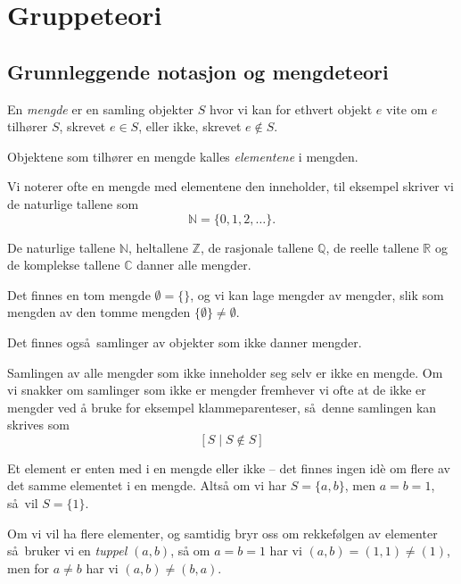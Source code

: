 \section{Gruppeteori}

\subsection{Grunnleggende notasjon og mengdeteori}


\begin{definition}
    En \textit{mengde} er en samling objekter $S$ hvor vi kan for
    ethvert objekt $e$ vite om $e$ tilhører $S$, skrevet $e\in S$,
    eller ikke, skrevet $e\notin S$.

    Objektene som tilhører en mengde kalles \textit{elementene}
    i mengden.
\end{definition}

Vi noterer ofte en mengde med elementene den inneholder,
til eksempel skriver vi de naturlige tallene som
\[
    \mathbb N = \{0, 1, 2, \dots\}.
\]
\begin{example}
    De naturlige tallene $\mathbb N$, heltallene $\mathbb Z$,
    de rasjonale tallene $\mathbb Q$,
    de reelle tallene $\mathbb R$
    og de komplekse tallene $\mathbb C$ danner alle mengder.

    Det finnes en tom mengde $\emptyset = \{\}$,
    og vi kan lage mengder av mengder,
    slik som mengden av den tomme mengden $\{\emptyset\}\neq\emptyset$.
\end{example}

Det finnes også samlinger av objekter som ikke danner mengder.
\begin{example}
    Samlingen av alle mengder som ikke inneholder seg selv er ikke en mengde.
    Om vi snakker om samlinger som ikke er mengder fremhever vi ofte at de ikke
    er mengder ved å bruke for eksempel klammeparenteser,
    så denne samlingen kan skrives som
    \[
        \left[
            S
            \mid
            S\notin S
        \right]
    \]
\end{example}

\begin{remark}
    Et element er enten med i en mengde eller ikke
    -- det finnes ingen id\`e om flere av det samme elementet i en mengde.
    Altså om vi har $S = \{a,b\}$, men $a = b = 1$,
    så vil $S = \{1\}$.

    Om vi vil ha flere elementer, og samtidig bryr oss om rekkefølgen av elementer
    så bruker vi en \textit{tuppel} $(a,b)$,
    så om $a = b = 1$ har vi $(a, b) = (1,1) \neq (1)$,
    men for $a\neq b$ har vi $(a, b)\neq (b, a)$.
\end{remark}

